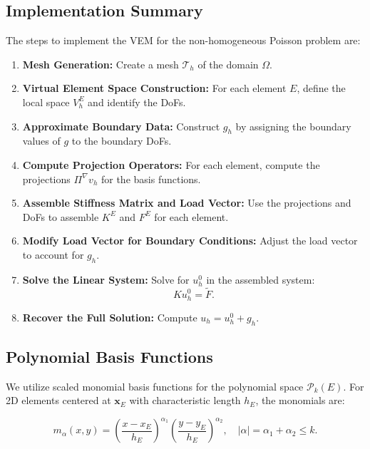\documentclass[class=article, crop=false]{standalone}
\begin{document}
\subsection{Implementation Summary}

The steps to implement the VEM for the non-homogeneous Poisson problem are:

\begin{enumerate}
    \item \textbf{Mesh Generation:} Create a mesh $\mathcal{T}_h$ of the domain $\Omega$.

    \item \textbf{Virtual Element Space Construction:} For each element $E$, define the local space $V_h^E$ and identify the DoFs.

    \item \textbf{Approximate Boundary Data:} Construct $g_h$ by assigning the boundary values of $g$ to the boundary DoFs.

    \item \textbf{Compute Projection Operators:} For each element, compute the projections $\Pi^\nabla v_h$ for the basis functions.

    \item \textbf{Assemble Stiffness Matrix and Load Vector:} Use the projections and DoFs to assemble $K^E$ and $F^E$ for each element.

    \item \textbf{Modify Load Vector for Boundary Conditions:} Adjust the load vector to account for $g_h$.

    \item \textbf{Solve the Linear System:} Solve for $u_h^0$ in the assembled system:
    \[
    K u_h^0 = \tilde{F}.
    \]

    \item \textbf{Recover the Full Solution:} Compute $u_h = u_h^0 + g_h$.
\end{enumerate}

\subsection{Polynomial Basis Functions}

We utilize scaled monomial basis functions for the polynomial space $\mathcal{P}_k(E)$. For 2D elements centered at $\mathbf{x}_E$ with characteristic length $h_E$, the monomials are:

\[
m_{\alpha}(x, y) = \left( \frac{x - x_E}{h_E} \right)^{\alpha_1} \left( \frac{y - y_E}{h_E} \right)^{\alpha_2}, \quad |\alpha| = \alpha_1 + \alpha_2 \leq k.
\]
\end{document}
